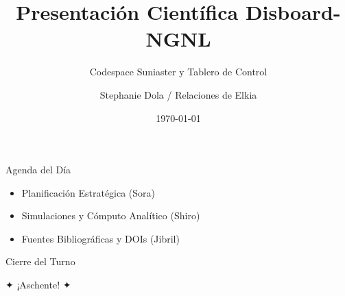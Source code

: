 \documentclass{beamer}
\title{Presentación Científica Disboard-NGNL}
\subtitle{Codespace Suniaster y Tablero de Control}
\author{Stephanie Dola / Relaciones de Elkia}
\date{\today}
\begin{document}
\begin{frame}
\titlepage
\end{frame}

\begin{frame}{Agenda del Día}
\begin{itemize}
    \item Planificación Estratégica (Sora)
    \item Simulaciones y Cómputo Analítico (Shiro)
    \item Fuentes Bibliográficas y DOIs (Jibril)
\end{itemize}
\end{frame}

\begin{frame}{Cierre del Turno}
\begin{center}
    \Huge \color{blue} ✦ ¡Aschente! ✦
\end{center}
\end{frame}
\end{document}
